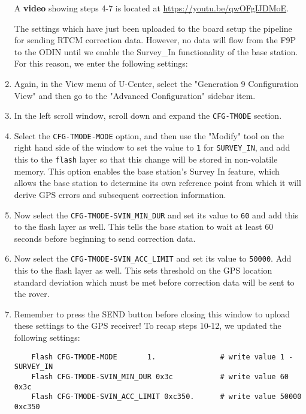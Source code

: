 \documentclass{article}%
\begin{document}
\begin{enumerate}
	\begin{myquote}
		A \textbf{video} showing steps 4-7 is located at 	\url{https://youtu.be/qwOFgIJDMoE}.
	\end{myquote}
	

	The settings which have just been uploaded to the board setup the pipeline for sending RTCM correction data.  However, no data will flow from the F9P to the ODIN until we enable the Survey\_In functionality of the base station. For this reason, we enter the following settings:
	
	\item Again, in the View menu of U-Center, select the "Generation 9 Configuration View" and then go to the "Advanced Configuration" sidebar item.
	\item In the left scroll window, scroll down and expand the \texttt{CFG-TMODE} section.
	\item Select the \texttt{CFG-TMODE-MODE} option, and then use the "Modify" tool on the right hand side of the window to set the value to \texttt{1} for \texttt{SURVEY\_IN}, and add this to the \texttt{flash} layer so that this change will be stored in non-volatile memory.  This option enables the base station's Survey In feature, which allows the base station to determine its own reference point from which it will derive GPS errors and subsequent correction information.
	\item Now select the \texttt{CFG-TMODE-SVIN\_MIN\_DUR} and set its value to \texttt{60} and add this to the flash layer as well.  This tells the base station to wait at least 60 seconds before beginning to send correction data.  
	\item Now select the \texttt{CFG-TMODE-SVIN\_ACC\_LIMIT} and set its value to \texttt{50000}.  Add this to the flash layer as well.  This sets threshold on the GPS location standard deviation which must be met before correction data will be sent to the rover.
	\item Remember to press the SEND button before closing this window to upload these settings to the GPS receiver!
	\newline
	\newline
	To recap steps 10-12, we updated the following settings:
	\begin{lstlisting}
	Flash CFG-TMODE-MODE       1.               # write value 1 - SURVEY_IN
	Flash CFG-TMODE-SVIN_MIN_DUR 0x3c           # write value 60  0x3c     
	Flash CFG-TMODE-SVIN_ACC_LIMIT 0xc350.      # write value 50000  0xc350
	\end{lstlisting}
	

\end{enumerate}
\end{document}
